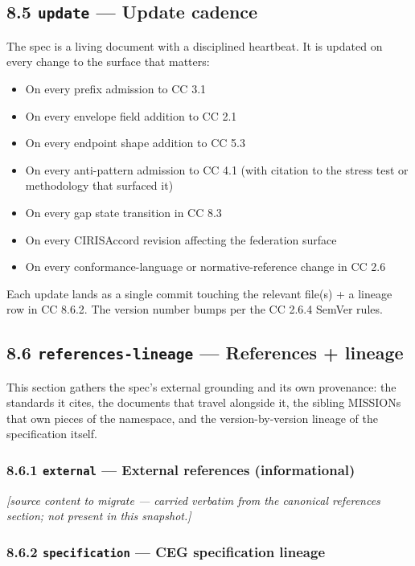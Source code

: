 \documentclass[11pt]{article}
\begin{document}
\subsection*{8.5 \texttt{update} — Update cadence}


The spec is a living document with a disciplined heartbeat. It is updated on every change to the surface that matters:


\begin{itemize}\setlength\itemsep{0pt}
\item On every prefix admission to CC 3.1
\item On every envelope field addition to CC 2.1
\item On every endpoint shape addition to CC 5.3
\item On every anti-pattern admission to CC 4.1 (with citation to the stress test or methodology that surfaced it)
\item On every gap state transition in CC 8.3
\item On every CIRISAccord revision affecting the federation surface
\item On every conformance-language or normative-reference change in CC 2.6
\end{itemize}


Each update lands as a single commit touching the relevant file(s) + a lineage row in CC 8.6.2. The version number bumps per the CC 2.6.4 SemVer rules.


\subsection*{8.6 \texttt{references-lineage} — References + lineage}


This section gathers the spec's external grounding and its own provenance: the standards it cites, the documents that travel alongside it, the sibling MISSIONs that own pieces of the namespace, and the version-by-version lineage of the specification itself.


\subsubsection*{8.6.1 \texttt{external} — External references (informational)}


\textit{[source content to migrate — carried verbatim from the canonical references section; not present in this snapshot.]}


\subsubsection*{8.6.2 \texttt{specification} — CEG specification lineage}
\end{document}
